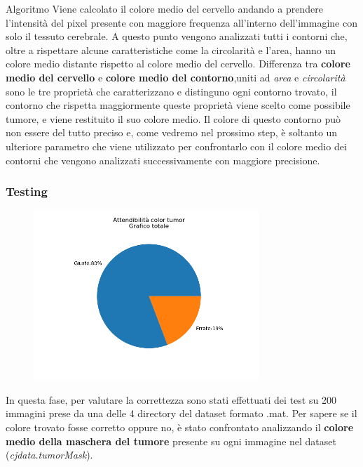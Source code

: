\documentclass{article}
\begin{document}
\begin{my theorem}{Algoritmo}
    Viene calcolato il colore medio del cervello andando a prendere l'intensità del pixel presente con maggiore frequenza 
    all'interno dell'immagine con solo il tessuto cerebrale.
    A questo punto vengono analizzati tutti i contorni che, oltre a rispettare alcune caratteristiche come la circolarità e l'area,
    hanno un colore medio distante rispetto al colore medio del cervello.
    Differenza tra \textbf{colore medio del cervello} e \textbf{colore medio del contorno},uniti ad \textit{area} e \textit{circolarità} 
    sono le tre proprietà che caratterizzano e distinguno ogni contorno trovato, il contorno che rispetta maggiormente queste 
    proprietà viene scelto come possibile tumore, e viene restituito il suo colore medio.
    Il colore di questo contorno può non essere del tutto preciso e, come vedremo nel prossimo step, è soltanto un 
    ulteriore parametro che viene utilizzato per confrontarlo con il colore medio dei contorni che vengono analizzati 
    successivamente con maggiore precisione.
\end{my theorem}

\subsubsection{Testing}

\begin{figure}
    \includegraphics[width=8.5cm]{images/ct.png}
\end{figure}

In questa fase, per valutare la correttezza sono stati effettuati dei test su 200 immagini prese da una delle 4 directory del 
dataset formato .mat.
Per sapere se il colore trovato fosse corretto oppure no, è stato confrontato analizzando il \textbf{colore medio della maschera del tumore}
presente su ogni immagine nel dataset (\textit{cjdata.tumorMask}).
\end{document}
